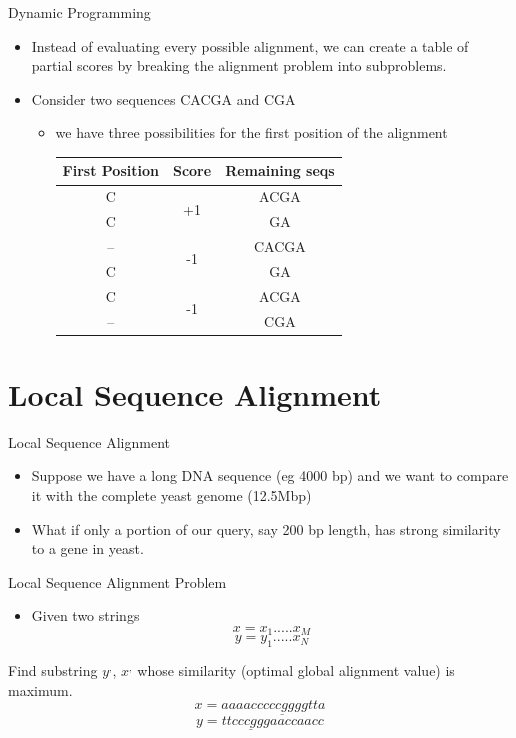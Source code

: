 \documentclass{bredelebeamer}
\begin{document}
  \begin{frame}{Dynamic Programming}
     \begin{itemize}
         \item Instead of evaluating every possible alignment, we can create a 
table of partial scores by breaking the alignment problem into subproblems.
\item Consider two sequences CACGA and CGA
\begin{itemize}
         \item we have three possibilities for the first position of the alignment
         \newline
\begin{table}[]
\begin{tabular}{|c|c|c|}
\hline
First Position & Score               & Remaining seqs \\ \hline
C              & \multirow{2}{*}{+1} & ACGA           \\
C              &                     & GA             \\ \hline
--             & \multirow{2}{*}{-1} & CACGA          \\
C              &                     & GA             \\ \hline
C              & \multirow{2}{*}{-1} & ACGA           \\
--             &                     & CGA            \\ \hline
\end{tabular}
\end{table}
     \end{itemize}
     \end{itemize}
 \end{frame}
 
 \section{Local Sequence Alignment}
  \begin{frame}{}
    \tableofcontents[currentsection]
\end{frame}
 \begin{frame}{Local Sequence Alignment}
\begin{itemize}
    \item Suppose we have a long DNA sequence (eg 4000 bp) and we want to compare it with the 
complete yeast genome (12.5Mbp)
\item What if only a portion of our query, say 200 bp
length, has strong similarity to a gene in yeast.
\end{itemize}   
 \end{frame}
  \begin{frame}{Local Sequence Alignment Problem}
\begin{itemize}
    \item Given two strings 
    $$x=x_1.....x_M$$ 
     $$y=y_1.....x_N$$
\end{itemize} 
Find substring $y^,$, $x^,$ whose similarity
(optimal global alignment value) is maximum.
 $$ x = aaaacc\underline{cccggg}gtta $$
 $$ y = tt\underline{cccggg}aaccaacc $$

 \end{frame}
\end{document}
